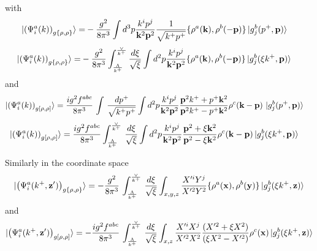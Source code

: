 \documentclass[aps,prd,amsmath,amssymb,nofootinbib]{revtex4-2}
\def\v#1{\mathbf{#1}}
\numberwithin{equation}{section}
\begin{document}
with 
\begin{align}\label{onegrho3mom}
\ket{ \left(\Psi^{a}_{i}(k) \right)_{g \{\rho, \rho\} } }
 = &  
 - \frac{g^2}{8\pi^3}%
  \int d^3p\frac{k^{i}p^{j}} {\v{k}^{2} \v{p}^2 }\frac{1}{\sqrt{k^{+}p^{+}}}
  \{\rho^{a}(\v{k}),\rho^{b}(-\v{p}) \}
  \ket{g_{j}^{b}(p^+,\v{p})}\,
\end{align}
\begin{align}\label{onegrho3}
\ket{ \left(\Psi^{a}_{i}(k) \right)_{g \{\rho, \rho\} } }
 = &  
 - \frac{g^2}{8\pi^3}%
 \int_{\frac{\Lambda}{k^{+}}}^{\frac{\vee}{k^{+}}} \frac{d \xi } {\sqrt{\xi}   }
  \int d^2p\frac{k^{i}p^{j}} {\v{k}^{2} \v{p}^2 } 
  \{\rho^{a}(\v{k}),\rho^{b}(-\v{p}) \}
  \ket{g_{j}^{b}(\xi k^+,\v{p})}\,
\end{align}
and 
\begin{align}\label{onegrho4mom}
  \ket{ \left(\Psi^{a}_{i}(k) \right)_{g [\rho, \rho] } }
 & = 
  \frac{ig^2 f^{abc}}{8\pi^3}\, \int\, \frac{dp^{+}}{\sqrt{k^{+}p^{+}}}
 \int d^2p\frac{k^{i}p^{j}} {\v{k}^{2} \v{p}^2 }  \frac{\v{p}^2 k^{+}+ p^{+} \v{k}^2}{\v{p}^2 k^{+}- p^{+} \v{k}^2}  \rho^{c}(\v{k} -\v{p})\,  \ket{g_{j}^{b}(p^+,\v{p})}\,
\end{align}
\begin{align}\label{onegrho4}
  \ket{ \left(\Psi^{a}_{i}(k) \right)_{g [\rho, \rho] } }
 & = 
  \frac{ig^2 f^{abc}}{8\pi^3}%
 \int_{\frac{\Lambda}{k^{+}}}^{\frac{\vee}{k^{+}}}\, \frac{d \xi } {\sqrt{\xi}   }
 \int d^2p\frac{k^{i}p^{j}} {\v{k}^{2} \v{p}^2 }  \frac{\v{p}^2 + \xi \v{k}^2}{\v{p}^2 - \xi \v{k}^2}  \rho^{c}(\v{k} -\v{p})  \ket{g_{j}^{b}(\xi k^+,\v{p})}\,
\end{align}

Similarly in the coordinate space 
\begin{align}\label{gtworhoX}
  \ket{ \left(\Psi^{a}_{i}(k^+, \v{z}') \right)_{g \{\rho, \rho\} } }
 = -\frac{g^{2}}{8\pi^{3}}\, \int_{\frac{\Lambda}{k^{+}}}^{\frac{\vee}{k^{+}}}\, \frac{d\xi}{\sqrt{\xi}}\int_{x,y,z}\frac{X^{\prime i} Y^{j}}{X^{\prime 2}Y^{2}}\{\rho^{a}(\v{x}),\rho^{b}(\v{y})\} \ket{g^{b}_{j}(\xi k^{+},\v{z})}
\end{align}
and 
\begin{align}\label{gtworhoX2}
  \ket{ \left(\Psi^{a}_{i}(k^+, \v{z}') \right)_{g [\rho, \rho] } }
 = -\frac{ig^{2}f^{abc}}{8\pi^{3}}\, \int_{\frac{\Lambda}{k^{+}}}^{\frac{\vee}{k^{+}}}\, \frac{d\xi}{\sqrt{\xi}} \int_{x,z}\frac{X^{\prime i}X^{j}}{X^{\prime 2}X^{2}}\frac{(X^{\prime 2}+\xi X^{2})}{(\xi X^{2}-X^{\prime 2})}\rho^{c}(\v{x})\ket{g^{b}_{j}(\xi k^{+},\v{z})}
\end{align}
\end{document}
